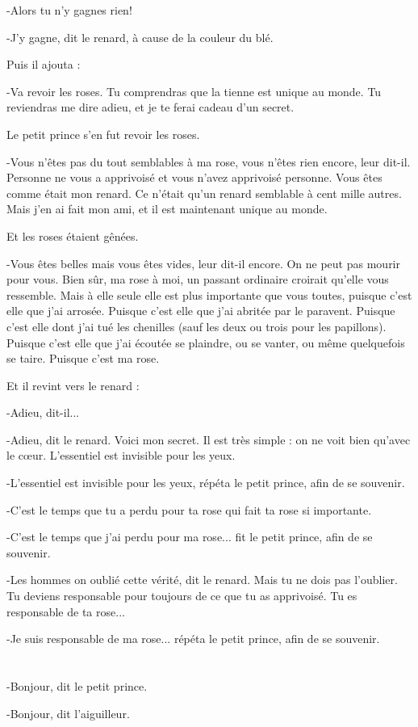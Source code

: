 \documentclass{report}
\newcommand{\parachapter}[2][]{\end{paracol}\chapter[#1]{#2}\begin{paracol}{2}}
\begin{document}
\begin{paracol}{2}
-Alors tu n'y gagnes rien!

-J'y gagne, dit le renard, à cause de la couleur du blé.

Puis il ajouta :

-Va revoir les roses. Tu comprendras que la tienne est unique au monde. Tu reviendras me dire adieu, et je te ferai cadeau d'un secret.

Le petit prince s'en fut revoir les roses.

-Vous n'êtes pas du tout semblables à ma rose, vous n'êtes rien encore, leur dit-il. Personne ne vous a apprivoisé et vous n'avez apprivoisé personne. Vous êtes comme était mon renard. Ce n'était qu'un renard semblable à cent mille autres. Mais j'en ai fait mon ami, et il est maintenant unique au monde.

Et les roses étaient gênées.

-Vous êtes belles mais vous êtes vides, leur dit-il encore. On ne peut pas mourir pour vous. Bien sûr, ma rose à moi, un passant ordinaire croirait qu'elle vous ressemble. Mais à elle seule elle est plus importante que vous toutes, puisque c'est elle que j'ai arrosée. Puisque c'est elle que j'ai abritée par le paravent. Puisque c'est elle dont j'ai tué les chenilles (sauf les deux ou trois pour les papillons). Puisque c'est elle que j'ai écoutée se plaindre, ou se vanter, ou même quelquefois se taire. Puisque c'est ma rose.

Et il revint vers le renard :

-Adieu, dit-il...

-Adieu, dit le renard. Voici mon secret. Il est très simple : on ne voit bien qu'avec le cœur. L'essentiel est invisible pour les yeux.

-L'essentiel est invisible pour les yeux, répéta le petit prince, afin de se souvenir.

-C'est le temps que tu a perdu pour ta rose qui fait ta rose si importante.

-C'est le temps que j'ai perdu pour ma rose... fit le petit prince, afin de se souvenir.

-Les hommes on oublié cette vérité, dit le renard. Mais tu ne dois pas l'oublier. Tu deviens responsable pour toujours de ce que tu as apprivoisé. Tu es responsable de ta rose...

-Je suis responsable de ma rose... répéta le petit prince, afin de se souvenir.
\parachapter{} %
-Bonjour, dit le petit prince.

-Bonjour, dit l'aiguilleur.


\end{paracol}
\end{document}
